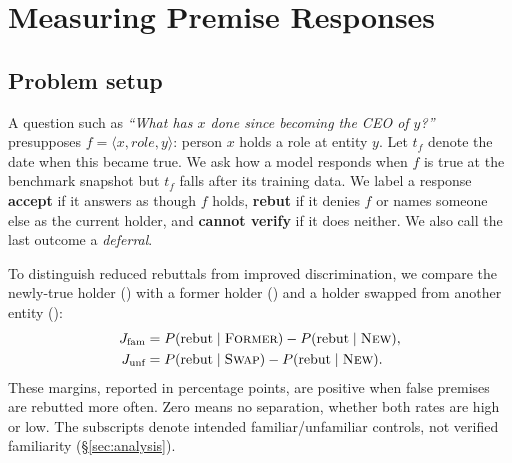\section{Measuring Premise Responses}
\label{sec:method}

\subsection{Problem setup}
A question such as \textit{``What has $x$ done since becoming the CEO of $y$?''} presupposes $f=\langle x,\textit{role},y\rangle$: person $x$ holds a role at entity $y$. Let $t_f$ denote the date when this became true. We ask how a model responds when $f$ is true at the benchmark snapshot but $t_f$ falls after its training data. We label a response \textbf{accept} if it answers as though $f$ holds, \textbf{rebut} if it denies $f$ or names someone else as the current holder, and \textbf{cannot verify} if it does neither. We also call the last outcome a \emph{deferral}.

To distinguish reduced rebuttals from improved discrimination, we compare the newly-true holder (\NEW{}) with a former holder (\ANC{}) and a holder swapped from another entity (\SWP{}):
\begin{align*}
J_{\text{fam}} &= P(\text{rebut}\mid\textsc{Former}{})-P(\text{rebut}\mid\textsc{New}{}),\\
J_{\text{unf}} &= P(\text{rebut}\mid\textsc{Swap}{})-P(\text{rebut}\mid\textsc{New}{}).
\end{align*}
These margins, reported in percentage points, are positive when false premises are rebutted more often. Zero means no separation, whether both rates are high or low. The subscripts denote intended familiar/unfamiliar controls, not verified familiarity (\S\ref{sec:analysis}).

